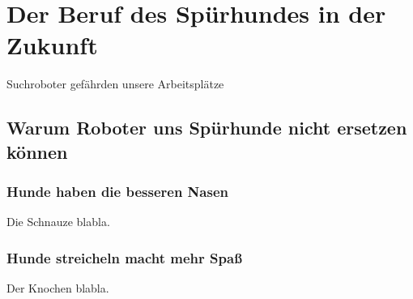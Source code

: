 \chapter{Der Beruf des Spürhundes in der Zukunft}
Suchroboter gefährden unsere Arbeitsplätze

\section{Warum Roboter uns Spürhunde nicht ersetzen können}

\subsection{Hunde haben die besseren Nasen}

Die \gls{Schnauze} blabla.

\subsection{Hunde streicheln macht mehr Spaß}

Der \gls{Knochen} blabla.
